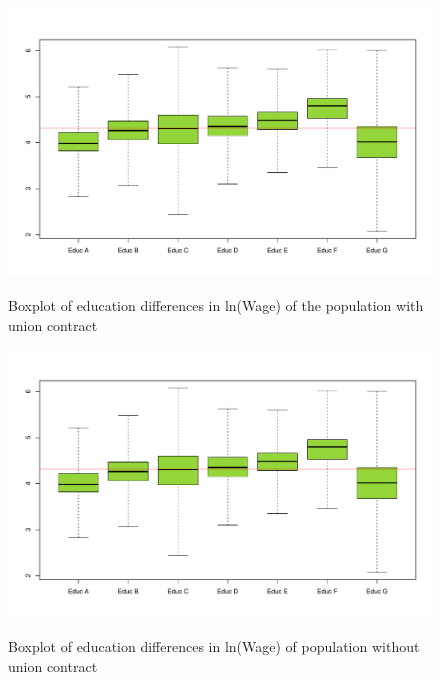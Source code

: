 \begin{figure}[H]
  \begin{center}
   \caption{Boxplot of education differences in ln(Wage) of the population with union contract}
    \includegraphics[scale=0.5]{boxploteducFCSC}\\
    \label{Fig:educFCSC}
  \end{center}
\end{figure}

\begin{figure}[H]
  \begin{center}
   \caption{Boxplot of education differences in ln(Wage) of population without union contract}
    \includegraphics[scale=0.5]{boxploteducFCSC}\\
    \label{Fig:educNoFCSC}
  \end{center}
\end{figure}